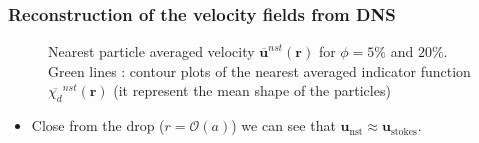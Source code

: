 \documentclass{sintefbeamer}
\newcommand{\nstavg}[1]{\overline{#1}^{nst}}
\begin{document}
\begin{frame}
  \frametitle{Reconstruction of the velocity fields from DNS}
  \begin{figure}[h!]
    \centering
    \caption{Nearest particle averaged velocity $\nstavg{\textbf{u}}(\textbf{r})$ for  $\phi = 5\%$ and $20\%$.
    Green lines : contour plots of the nearest averaged indicator function $\nstavg{\chi_d}(\textbf{r})$ (it represent the mean shape of the particles)}
    \label{fig:Stream}
  \end{figure}
  
  \begin{itemize}
    \item Close from the drop ($r=\mathcal{O}(a)$) we can see that $\textbf{u}_\text{nst} \approx \textbf{u}_\text{stokes}$. 
  \end{itemize}
\end{frame}
\end{document}
